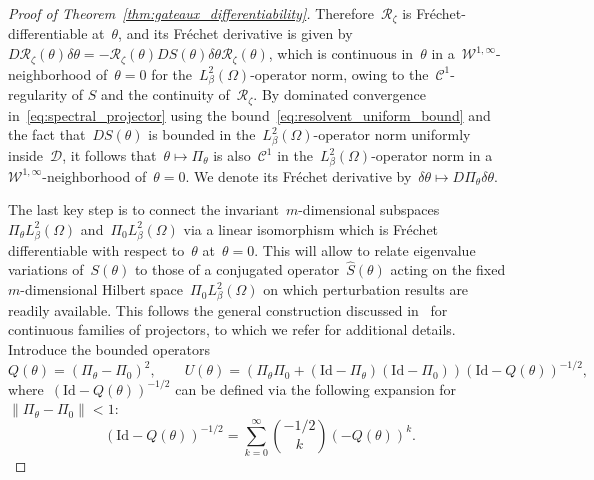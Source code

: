 \documentclass[a4]{article}
\newcommand{\1}{\mathbbm 1}
\newcommand{\Winf}{{{\cW}^{1,\infty}}}
\newcommand{\Id}{\mathrm{Id}}
\newcommand{\cW}{\mathcal{W}}
\begin{document}
\begin{proof}[Proof of Theorem~\ref{thm:gateaux_differentiability}]
    Therefore~$\mathcal R_\zeta$ is Fréchet-differentiable at~$\theta$, and its Fréchet derivative is given by~$D \mathcal R_\zeta(\theta)\delta\theta = -\mathcal R_\zeta(\theta)DS(\theta)\delta\theta\mathcal R_\zeta(\theta)$, which is continuous in~$\theta$ in a~$\Winf$-neighborhood of~$\theta=0$ for the~$L^2_\beta(\Omega)$-operator norm, owing to the~$\mathcal C^1$-regularity of $S$ and the continuity of~$\mathcal R_\zeta$.
    By dominated convergence in~\eqref{eq:spectral_projector} using the bound~\eqref{eq:resolvent_uniform_bound} and the fact that~$D S(\theta)$ is bounded in the~$L^2_\beta(\Omega)$-operator norm uniformly inside~$\mathcal D$, it follows that~$\theta\mapsto \Pi_\theta$ is also~$\mathcal C^1$ in the~$L^2_\beta(\Omega)$-operator norm in a~$\Winf$-neighborhood of~$\theta=0$. We denote its Fréchet derivative by~$\delta\theta\mapsto D \Pi_\theta\delta\theta$.

    The last key step is to connect the invariant~$m$-dimensional subspaces~${\Pi_\theta L^2_\beta(\Omega)}$ and~${\Pi_0 L^2_\beta(\Omega)}$ via a linear isomorphism which is Fréchet differentiable with respect to~$\theta$ at~$\theta=0$.
    This will allow to relate eigenvalue variations of~$S(\theta)$ to those of a conjugated operator~$\widehat S(\theta)$ acting on the fixed $m$-dimensional Hilbert space~${\Pi_0 L^2_\beta(\Omega)}$ on which perturbation results are readily available.
    This follows the general construction discussed in~\cite[Section I.4.6]{K13} for continuous families of projectors, to which we refer for additional details.
    Introduce the bounded operators
    \begin{equation}
        Q(\theta) = (\Pi_\theta-\Pi_0)^2,\qquad U(\theta) = \left(\Pi_\theta\Pi_0+(\Id-\Pi_\theta)(\Id-\Pi_0)\right)(\Id-Q(\theta))^{-1/2},
    \end{equation}
    where~$(\Id-Q(\theta))^{-1/2}$ can be defined via the following expansion for~$\|\Pi_\theta-\Pi_0\|<1$:
    $$(\Id-Q(\theta))^{-1/2} = \sum_{k=0}^\infty {{-1/2}\choose{k}} (-Q(\theta))^k.$$


\end{proof}
\end{document}
